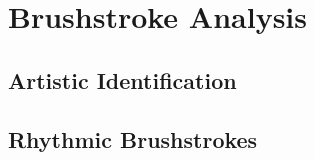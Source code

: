 \documentclass[conference]{IEEEtran}
\begin{document}
\section{Brushstroke Analysis}

\subsection{Artistic Identification}

\subsection{Rhythmic Brushstrokes}









\end{document}
